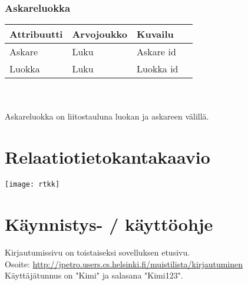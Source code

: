 \documentclass{report}
\begin{document}
\subsubsection*{Askareluokka}
\begin{tabular}{ | l | l | l | p{7.5cm} |} \hline
\textbf{Attribuutti} & \textbf{Arvojoukko} & \textbf{Kuvailu} \\ \hline
Askare & Luku & Askare id \\ \hline
Luokka & Luku & Luokka id \\ \hline
\end{tabular}
\\ \\ Askareluokka on liitostauluna luokan ja askareen välillä.

\section*{Relaatiotietokantakaavio}
\texttt{[image: rtkk]}

\section*{Käynnistys- / käyttöohje}
\noindent Kirjautumissivu on toistaiseksi sovelluksen etusivu. \\ Osoite: \href{http://jpetro.users.cs.helsinki.fi/muistilista/kirjautuminen}{http://jpetro.users.cs.helsinki.fi/muistilista/kirjautuminen} \\
Käyttäjätunnus on "Kimi" ja salasana "Kimi123".
\end{document}
